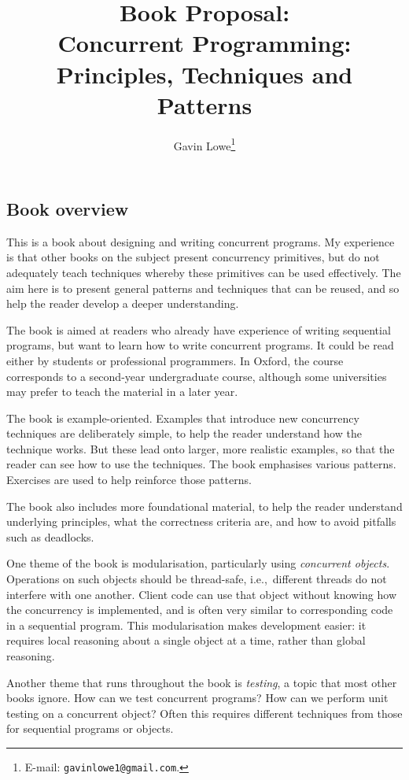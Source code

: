 \documentclass[12pt,a4paper]{article}
\title{Book Proposal: \\ 
Concurrent Programming: \\ Principles, Techniques and Patterns}
\author{Gavin Lowe\footnote{E-mail: \texttt{gavinlowe1@gmail.com}.}}
\begin{document}
\maketitle

\subsection*{Book overview}

This is a book about designing and writing concurrent programs.  My experience
is that other books on the subject present concurrency primitives, but do not
adequately teach techniques whereby these primitives can be used effectively.
The aim here is to present general patterns and techniques that can be reused,
and so help the reader develop a deeper understanding.

The book is aimed at readers who already have experience of writing sequential
programs, but want to learn how to write concurrent programs.  It could be
read either by students or professional programmers.  In Oxford, the course
corresponds to a second-year undergraduate course, although some universities
may prefer to teach the material in a later year.

The book is example-oriented.  Examples that introduce new concurrency
techniques are deliberately simple, to help the reader understand how the
technique works.  But these lead onto larger, more realistic examples, so that
the reader can see how to use the techniques.  The book emphasises various
patterns.  Exercises are used to help reinforce those patterns. 

The book also includes more foundational material, to help the reader
understand underlying principles, what the correctness criteria are, and how
to avoid pitfalls such as deadlocks.

One theme of the book is modularisation, particularly using \emph{concurrent
  objects}.  Operations on such objects should be thread-safe, i.e.,~different
threads do not interfere with one another.  Client code can use that object
without knowing how the concurrency is implemented, and is often very similar
to corresponding code in a sequential program.  This modularisation makes
development easier: it requires local reasoning about a single object at a
time, rather than global reasoning.

Another theme that runs throughout the book is \emph{testing}, a topic that
most other books ignore.  How can we test concurrent programs?  How can we
perform unit testing on a concurrent object?  Often this requires different
techniques from those for sequential programs or objects.
\end{document}
